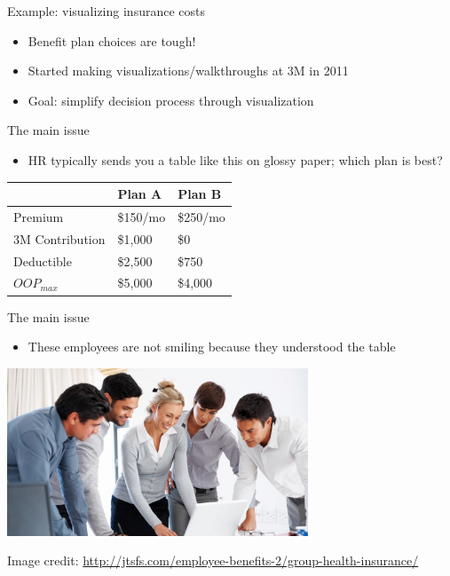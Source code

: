 \documentclass[sans,aspectratio=169,presentation,bigger,fleqn]{beamer}
\begin{document}
\begin{frame}[label=sec-15]{Example: visualizing insurance costs}
\begin{itemize}
\item Benefit plan choices are tough!
\item Started making visualizations/walkthroughs at 3M in 2011
\item Goal: simplify decision process through visualization
\end{itemize}
\end{frame}

\begin{frame}[label=sec-16]{The main issue}
\begin{itemize}
\item HR typically sends you a table like this on glossy paper; which plan is best?
\end{itemize}

\begin{center}
\begin{tabular}{lll}
\toprule
 & Plan A & Plan B\\
\midrule
Premium & \$150/mo & \$250/mo\\
3M Contribution & \$1,000 & \$0\\
Deductible & \$2,500 & \$750\\
\(OOP_{max}\) & \$5,000 & \$4,000\\
\bottomrule
\end{tabular}
\end{center}
\end{frame}

\begin{frame}[label=sec-17]{The main issue}
\begin{itemize}
\item These employees are not smiling because they understood the table
\end{itemize}

\begin{center}
\includegraphics[height=5cm]{./img/choosing-insurance.jpg}
\end{center}

\tiny
Image credit: \url{http://jtsfs.com/employee-benefits-2/group-health-insurance/}
\end{frame}
\end{document}

